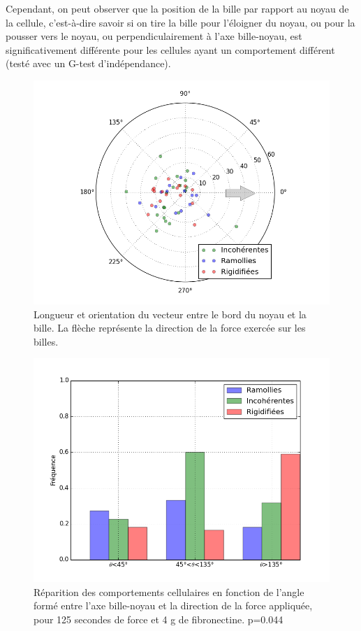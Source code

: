 Cependant, on peut observer que la position de la bille par rapport au noyau de la cellule, c'est-à-dire savoir si on tire la bille pour l'éloigner du noyau, ou pour la pousser vers le noyau, ou perpendiculairement à l'axe bille-noyau, est significativement différente pour les cellules ayant un comportement différent (testé avec un G-test d'indépendance). 
\begin{figure}
\includegraphics[scale=0.5]{Figures/Positions_FRI.png} 
\caption{Longueur et orientation du vecteur entre le bord du noyau et la bille. La flèche représente la direction de la force exercée sur les billes.}
\end{figure}
\begin{figure}
\includegraphics[scale=0.5]{Figures/Hist_Angles.png} 
\caption{Réparition des comportements cellulaires en fonction de l'angle formé entre l'axe bille-noyau et la direction de la force appliquée, pour 125 secondes de force et 4 \micro g de fibronectine. p=0.044 \label{Angle_C4}}
\end{figure}


